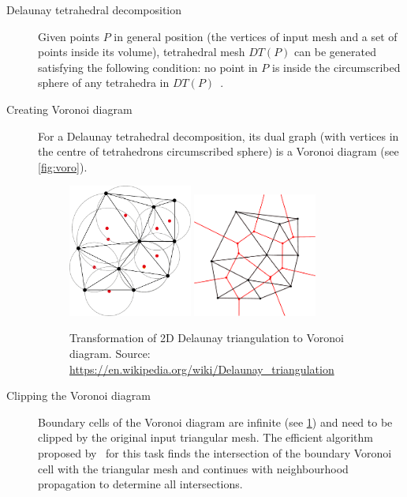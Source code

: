\begin{description}
    \item[Delaunay tetrahedral decomposition] Given points $P$ in general position (the vertices of input mesh and a set of points inside its volume), tetrahedral mesh $DT(P)$ can be generated satisfying the following condition: no point in $P$ is inside the circumscribed sphere of any tetrahedra in $DT(P)$~\cite{cignoni1993parallel}.
    \item[Creating Voronoi diagram] For a Delaunay tetrahedral decomposition, its dual graph (with vertices in the centre of tetrahedrons circumscribed sphere) is a Voronoi diagram (see \cref{fig:voro}).
    
 \begin{figure}
    \centering
    \includegraphics[width=0.4\textwidth]{img/delaunay}
    \includegraphics[width=0.4\textwidth]{img/voronoi}
    \caption{Transformation of 2D Delaunay triangulation to Voronoi diagram. Source: \url{https://en.wikipedia.org/wiki/Delaunay\_triangulation}}
    \label{fig:DT}
\end{figure}

    \item[Clipping the Voronoi diagram] Boundary cells of the Voronoi diagram are infinite (see \cref{fig:DT}) and need to be clipped by the original input triangular mesh. The efficient algorithm proposed by~\citet{yan2010efficient} for this task finds the intersection of the boundary Voronoi cell with the triangular mesh and continues with neighbourhood propagation to determine all intersections. 
\end{description}


